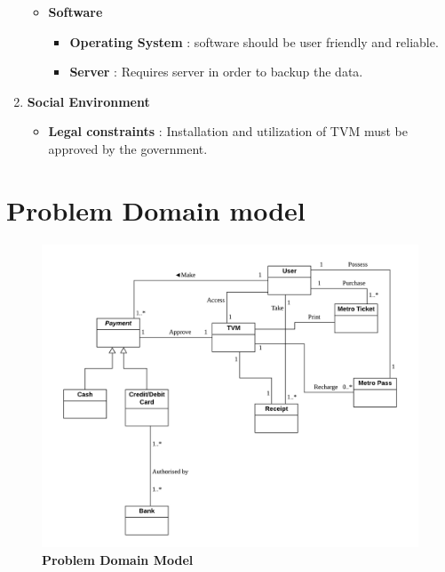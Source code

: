 \documentclass[15pt]{article}
\begin{document}
\begin{enumerate}[leftmargin=2em, itemsep=0pt, parsep=0pt, , font=\Large\bfseries]
\begin{itemize}
\begin{itemize}
                \end{itemize}
            \item {\Large\bfseries Software}
                \begin{itemize}
                    \item {\Large\bfseries Operating System} : software should be user friendly and reliable.
                    \item {\Large\bfseries Server} : Requires server in order to backup the data.
                \end{itemize}
        \end{itemize}
    \item {\Large\bfseries Social Environment}
    \begin{itemize}
            \item {\Large\bfseries Legal constraints} : Installation and utilization of TVM must be approved by the government.
        \end{itemize}
\end{enumerate}



\newpage
\section{\Large{ Problem Domain model}}

\begin{figure}[H]
\centering
\includegraphics[scale=0.4]{domain.png}
\caption{\Large\bfseries{Problem Domain Model\cite{prieto1991domain}}}
\label{Problem Domain Model:do}
\end{figure}
\end{document}
